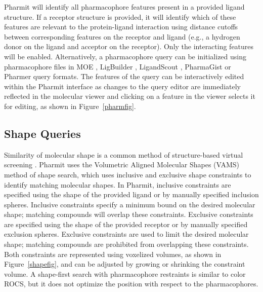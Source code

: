 Pharmit will identify all pharmacophore features present in a provided ligand structure. If a receptor structure is provided, it will identify which of these features are relevant to the protein-ligand interaction using distance cutoffs between corresponding features on the receptor and ligand (e.g., a hydrogen donor on the ligand and acceptor on the receptor). Only the interacting features will be enabled. Alternatively, a pharmacophore query can be initialized using pharmacophore files in MOE \cite{moe}, LigBuilder \cite{Wang_2000}, LigandScout \cite{Wolber_2005}, PharmaGist \cite{Schneidman_Duhovny_2008} or Pharmer \cite{Koes_2011} query formats.  The features of the query can be interactively edited within the Pharmit interface as changes to the query editor are immediately reflected in the molecular viewer and clicking on a feature in the viewer selects it for editing, as shown in Figure~\ref{pharmfig}.


\subsection{Shape Queries}

Similarity of molecular shape is a common method of structure-based virtual screening \cite{Nicholls_2010}.  Pharmit uses the Volumetric Aligned Molecular Shapes (VAMS) \cite{vams} method of shape search, which uses inclusive and exclusive shape constraints to identify matching molecular shapes.  In Pharmit, inclusive constraints are specified using the shape of the provided ligand or by manually specified inclusion spheres. Inclusive constraints specify a minimum bound on the desired molecular shape; matching compounds will overlap these constraints. Exclusive constraints are specified using the shape of the provided receptor or by manually specified exclusion spheres.  Exclusive constraints are used to limit the desired molecular shape; matching compounds are prohibited from overlapping these constraints.  Both constraints are represented using voxelized volumes, as shown in Figure~\ref{shapefig}, and can be adjusted by growing or shrinking the constraint volume. A shape-first search with pharmacophore restraints is similar to color ROCS, but it does not optimize the position with respect to the pharmacophores.

